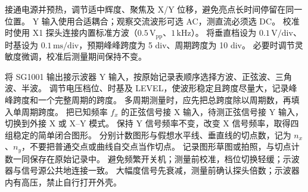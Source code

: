 \clearpage
{}
接通电源并预热，调节适中辉度、聚焦及 X/Y 位移，避免亮点长时间停留在同一位置。
Y 输入使用合适耦合；观察交流波形可选 AC，测直流必须选 DC。
校准时使用 X1 探头连接内置标准方波（$0.5\,\mathrm{V_{pp}}$、$1\,\mathrm{kHz}$）。
将垂直档设为 $0.1\,\mathrm{V/div}$、时基设为 $0.1\,\mathrm{ms/div}$，预期峰峰跨度为 5 div、周期跨度为 10 div。
必要时调节灵敏度微调，校准后测量期间保持不变。\par
{}
将 SG1001 输出接示波器 Y 输入，按原始记录表顺序选择方波、正弦波、三角波、半波。
调节电压档位、时基及 LEVEL，使波形稳定且跨度尽量大，记录峰峰跨度和一个完整周期的跨度。
多周期测量时，应先把总跨度除以周期数，再填入单周期跨度。
把已知频率 $f_x$ 的正弦信号接 X 输入，待测正弦信号接 Y 输入，切换到外接 X 或 X--Y 模式。
保持 Y 信号频率不变，改变 X 信号频率，取得四组稳定的简单闭合图形。
分别计数图形与假想水平线、垂直线的切点数，记为 $n_x$、$n_y$，不要把普通交点或曲线自交点当作切点。
记录图形草图或拍照，与切点计数一同保存在原始记录中。
避免频繁开关机；测量前校准，档位切换轻缓；示波器与信号源公共地连接一致。
大幅度信号先衰减，测量前确认探头倍数；示波器内有高压，禁止自行打开外壳。


